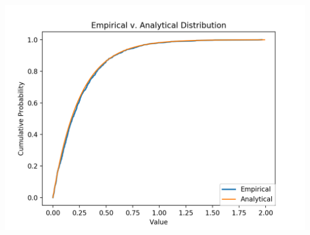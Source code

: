 \documentclass[letterpaper,11pt]{article}
\theoremstyle{mytheor}
\begin{document}
\\
\includegraphics[scale=1]{Empirical-v-Analytical.png}\\
\\
\end{document}
